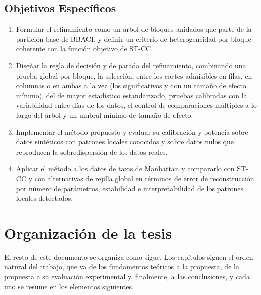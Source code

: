 \subsection{Objetivos Específicos}
\label{subsec:objetivos-especificos}

\begin{enumerate}
    \item Formular el refinamiento como un árbol de bloques anidados que
          parte de la partición base de \ac{BBACI}, y definir un criterio
          de heterogeneidad por bloque coherente con la función objetivo 
          de \ac{ST-CC}.

    \item Diseñar la regla de decisión y de parada del refinamiento,
          combinando una prueba global por bloque, la selección, entre
          los cortes admisibles en filas, en columnas o en ambas a la vez (los
          significativos y con un tamaño de efecto mínimo), del de mayor
          estadístico estandarizado, pruebas calibradas
          con la variabilidad entre días de los datos, el control de
          comparaciones múltiples a lo largo del árbol y un umbral mínimo de
          tamaño de efecto.

    \item Implementar el método propuesto y evaluar su calibración y
          potencia sobre datos sintéticos con patrones locales conocidos y
          sobre datos nulos que reproducen la sobredispersión de los datos
          reales.

    \item Aplicar el método a los datos de taxis de Manhattan y compararlo
          con \ac{ST-CC} y con alternativas de rejilla global en términos
          de error de reconstrucción por número de parámetros, estabilidad
          e interpretabilidad de los patrones locales detectados.
\end{enumerate}

\section{Organización de la tesis}
\label{sec:organizacion}

El resto de este documento se organiza como sigue. Los capítulos siguen el
orden natural del trabajo, que va de los fundamentos teóricos a la propuesta,
de la propuesta a su evaluación experimental y, finalmente, a las
conclusiones, y cada uno se resume en los elementos siguientes.

